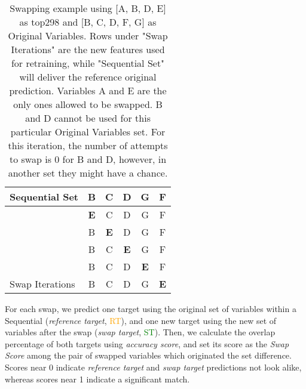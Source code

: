 \begin{table}[!htbp]
{\begin{tabular}{l|c|c|c|c|c|}
\multicolumn{1}{|l|}{Sequential Set}                          & B                                  & C                                  & D                                  & G                                  & F                                  \\ \hline
\multicolumn{1}{|l|}{}                                  & \cellcolor{blue}\textbf{E} & \cellcolor[HTML]{F1F8F6}C          & \cellcolor[HTML]{F1F8F6}D          & \cellcolor[HTML]{F1F8F6}G          & \cellcolor[HTML]{F1F8F6}F          \\ \cline{2-6} 
\multicolumn{1}{|l|}{}                                  & B                                  & \cellcolor{blue}\textbf{E} & D                                  & G                                  & F                                  \\ \cline{2-6} 
\multicolumn{1}{|l|}{}                                  & \cellcolor[HTML]{F1F8F6}B          & \cellcolor[HTML]{F1F8F6}C          & \cellcolor{blue}\textbf{E} & \cellcolor[HTML]{F1F8F6}G          & \cellcolor[HTML]{F1F8F6}F          \\ \cline{2-6} 
\multicolumn{1}{|l|}{}                                  & B                                  & C                                  & D                                  & \cellcolor{blue}\textbf{E} & F                                  \\ \cline{2-6} 
\multicolumn{1}{|l|}{\multirow{-5}{*}{Swap Iterations}} & \cellcolor[HTML]{F1F8F6}B          & \cellcolor[HTML]{F1F8F6}C          & \cellcolor[HTML]{F1F8F6}D          & \cellcolor[HTML]{F1F8F6}G          & \cellcolor{blue}\textbf{E} \\ \hline
\end{tabular}%
}
\caption{Swapping example using [A, B, D, E] as top298 and [B, C, D, F, G] as Original Variables. Rows under "Swap Iterations" are the new features used for retraining, while "Sequential Set" will deliver the reference original prediction. Variables A and E are the only ones allowed to be swapped. B and D cannot be used for this particular Original Variables set. For this iteration, the number of attempts to swap is 0 for B and D, however, in another set they might have a chance.}
\label{tbl:swap-example}
\end{table}

For each swap, we predict one target using the original set of variables within a Sequential (\emph{reference target}, \textcolor{orange}{RT}), and one new target using the new set of variables after the swap (\emph{swap target}, \textcolor{green}{ST}). Then, we calculate the overlap percentage of both targets using \emph{accuracy score}, and set its score as the \emph{Swap Score} among the pair of swapped variables which originated the set difference. Scores near 0 indicate \emph{reference target} and \emph{swap target} predictions not look alike, whereas scores near 1 indicate a significant match.

